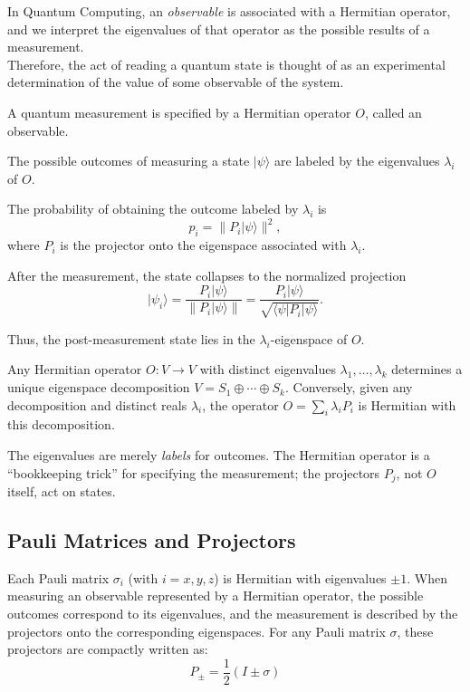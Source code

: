 \documentclass[10pt,a4paper]{article}
\begin{document}
In Quantum Computing, an \textit{observable} is associated with a Hermitian operator, and we interpret the eigenvalues of that operator as the possible results of a measurement.\\
 \hspace*{15pt}Therefore, the act of reading a quantum state is thought of as an experimental determination of the value of some observable of the system.

\begin{tcolorbox}
    [propstyle, title={Postulate}]
 A quantum measurement is specified by a Hermitian operator \(O\), called an observable.

The possible outcomes of measuring a state \(|\psi\rangle\) are labeled by the eigenvalues \(\lambda_i\) of \(O\).

The probability of obtaining the outcome labeled by \(\lambda_i\) is
\[
p_i = \|P_i|\psi\rangle\|^2,
\]
where \(P_i\) is the projector onto the eigenspace associated with \(\lambda_i\).

After the measurement, the state collapses to the normalized projection
\[
|\psi_i\rangle
=
\frac{P_i|\psi\rangle}{\|P_i|\psi\rangle\|}
=
\frac{P_i|\psi\rangle}
{\sqrt{\langle \psi | P_i | \psi \rangle}}.
\]

Thus, the post-measurement state lies in the \(\lambda_i\)-eigenspace of \(O\).
\end{tcolorbox}

Any Hermitian operator $O:V\to V$ with distinct eigenvalues $\lambda_1,\dots,\lambda_k$ determines a unique eigenspace decomposition $V=S_1\oplus\cdots\oplus S_k$. Conversely, given any decomposition and distinct reals $\lambda_i$, the operator $O=\sum_i\lambda_i P_i$ is Hermitian with this decomposition.

The eigenvalues are merely \emph{labels} for outcomes. The Hermitian operator is a ``bookkeeping trick'' for specifying the measurement; the projectors $P_j$, not $O$ itself, act on states.



\subsection{Pauli Matrices and Projectors}

Each Pauli matrix $\sigma_i$ (with $i = x, y, z$) is Hermitian with eigenvalues $\pm 1$.
When measuring an observable represented by a Hermitian operator, the possible outcomes
correspond to its eigenvalues, and the measurement is described by the projectors onto
the corresponding eigenspaces. For any Pauli matrix $\sigma$, these projectors are
compactly written as:
\begin{equation}
    P_{\pm} = \frac{1}{2}(I \pm \sigma)
\end{equation}
\end{document}
